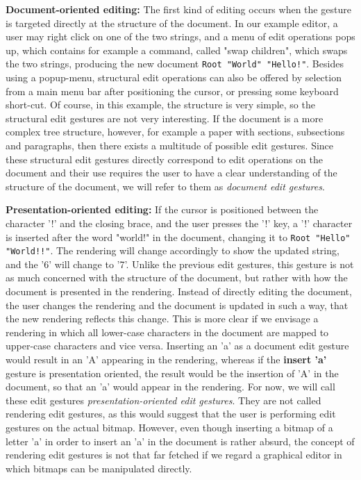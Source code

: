 \documentclass[twoside,epsf]{report}
\begin{document}
{\bf Document-oriented editing:} The first kind of editing occurs when the gesture is targeted directly at the structure of the document. In our example editor, a user may right click on one of the two strings, and a menu of edit operations pops up, which contains for example a command, called "swap children", which swaps the two strings, producing the new document \texttt{Root "World" "Hello!"}. Besides using a popup-menu, structural edit operations can also be offered by selection from a main menu bar after positioning the cursor, or pressing some keyboard short-cut. Of course, in this example, the structure is very simple, so the structural edit gestures are not very interesting. If the document is a more complex tree structure, however, for example a paper with sections, subsections and paragraphs, then there exists a multitude of possible edit gestures. Since these structural edit gestures directly correspond to edit operations on the document and their use requires the user to have a clear understanding of the structure of the document, we will refer to them as {\em document edit gestures}. 

{\bf Presentation-oriented editing: }If the cursor is positioned between the character '!' and the closing brace, and the user presses the '!' key, a '!' character is inserted after the word "world!" in the document, changing it to \texttt{Root "Hello" "World!!"}. The rendering will change accordingly to show the updated string, and the '6' will change to '7'. Unlike the previous edit gestures, this gesture is not as much concerned with the structure of the document, but rather with how the document is presented in the rendering. Instead of directly editing the document, the user changes the rendering and the document is updated in such a way, that the new rendering reflects this change. This is more clear if we envisage a rendering in which all lower-case characters in the document are mapped to upper-case characters and vice versa. Inserting an 'a' as a document edit gesture would result in an 'A' appearing in the rendering, whereas if the {\bf insert 'a'} gesture is presentation oriented, the result would be the insertion of 'A' in the document, so that an 'a' would appear in the rendering. For now, we will call these edit gestures {\em presentation-oriented edit gestures}. They are not called rendering edit gestures, as this would suggest that the user is performing edit gestures on the actual bitmap. However, even though inserting a bitmap of a letter 'a' in order to insert an 'a' in the document is rather absurd, the concept of rendering edit gestures is not that far fetched if we regard a graphical editor in which bitmaps can be manipulated directly. 
\end{document}
